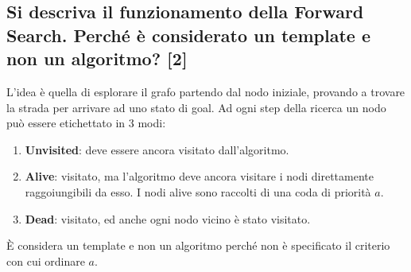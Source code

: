 \documentclass[\main/main.tex]{subfiles}
\begin{document}
\subsection{Si descriva il funzionamento della Forward Search.  Perché è considerato un template e non un algoritmo? [2]}
L'idea è quella di esplorare il grafo partendo dal nodo iniziale, provando a trovare la strada per arrivare ad uno stato di goal. Ad ogni step della ricerca un nodo può essere etichettato in 3 modi:

\begin{enumerate}
  \item \textbf{Unvisited}: deve essere ancora visitato dall'algoritmo.
  \item \textbf{Alive}: visitato, ma l'algoritmo deve ancora visitare i nodi direttamente raggoiungibili da esso. I nodi alive sono raccolti di una coda di priorità $a$.
  \item \textbf{Dead}: visitato, ed anche ogni nodo vicino è stato visitato.
\end{enumerate}

È considera un template e non un algoritmo perché non è specificato il criterio con cui ordinare $a$.

%
%
%
\end{document}
